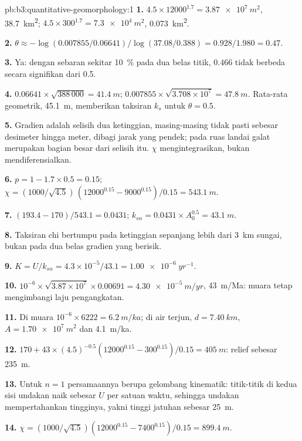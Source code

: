 \begin{solution}{pb:b3:quantitative-geomorphology:1}
\textbf{1.} $4.5\times12000^{1.7} = \qty{3.87e7}{m^2}$, \qty{38.7}{km^2};
$4.5\times300^{1.7} = \qty{7.3e4}{m^2}$, \qty{0.073}{km^2}.

\textbf{2.} $\theta \approx -\log(0.007855/0.06641)/\log(37.08/0.388) =
0.928/1.980 = 0.47$.

\textbf{3.} Ya: dengan sebaran sekitar \qty{10}{\percent} pada dua belas titik,
$0.466$ tidak berbeda secara signifikan dari 0.5.

\textbf{4.} $0.06641\times\sqrt{388\,000} = \qty{41.4}{m}$;
$0.007855\times\sqrt{3.708\times10^7} = \qty{47.8}{m}$. Rata-rata geometrik,
\qty{45.1}{m}, memberikan taksiran $k_s$ untuk $\theta = 0.5$.

\textbf{5.} Gradien adalah selisih dua ketinggian, masing-masing tidak pasti
sebesar desimeter hingga meter, dibagi jarak yang pendek; pada ruas landai
galat merupakan bagian besar dari selisih itu. $\chi$ mengintegrasikan, bukan
mendiferensialkan.

\textbf{6.} $p = 1 - 1.7\times0.5 = 0.15$; $\chi = (1000/\sqrt{4.5})\,
(12000^{0.15} - 9000^{0.15})/0.15 = \qty{543.1}{m}$.

\textbf{7.} $(193.4 - 170)/543.1 = 0.0431$; $k_{sn} = 0.0431\times A_0^{0.5}
= \qty{43.1}{m}$.

\textbf{8.} Taksiran chi bertumpu pada ketinggian sepanjang lebih dari \qty{3}{km}
sungai, bukan pada dua belas gradien yang berisik.

\textbf{9.} $K = U/k_{sn} = 4.3\times10^{-5}/43.1 = \qty{1.00e-6}{yr^{-1}}$.

\textbf{10.} $10^{-6}\times\sqrt{3.87\times10^7}\times0.00691 =
\qty{4.30e-5}{m/yr}$, \qty{43}{m/Ma}: muara tetap mengimbangi
laju pengangkatan.

\textbf{11.} Di muara $10^{-6}\times6222 = \qty{6.2}{m/ka}$; di
air terjun, $d = \qty{7.40}{km}$, $A = \qty{1.70e7}{m^2}$ dan
\qty{4.1}{m/ka}.

\textbf{12.} $170 + 43\times(4.5)^{-0.5}(12000^{0.15} - 300^{0.15})/0.15 =
\qty{405}{m}$: relief sebesar \qty{235}{m}.

\textbf{13.} Untuk $n = 1$ persamaannya berupa gelombang kinematik: titik-titik di kedua
sisi undakan naik sebesar $U$ per satuan waktu, sehingga undakan mempertahankan tingginya,
yakni tinggi jatuhan sebesar \qty{25}{m}.

\textbf{14.} $\chi = (1000/\sqrt{4.5})(12000^{0.15} - 7400^{0.15})/0.15 =
\qty{899.4}{m}$.


\end{solution}
